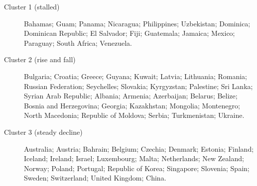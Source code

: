 \begin{description}
\item[Cluster 1 (stalled)] Bahamas; Guam; Panama; Nicaragua; Philippines; Uzbekistan; Dominica; Dominican Republic; El Salvador; Fiji; Guatemala; Jamaica; Mexico; Paraguay; South Africa; Venezuela.
\item[Cluster 2 (rise and fall)] Bulgaria; Croatia; Greece; Guyana; Kuwait; Latvia; Lithuania; Romania; Russian Federation; Seychelles; Slovakia; Kyrgyzstan; Palestine; Sri Lanka; Syrian Arab Republic; Albania; Armenia; Azerbaijan; Belarus; Belize; Bosnia and Herzegovina; Georgia; Kazakhstan; Mongolia; Montenegro; North Macedonia; Republic of Moldova; Serbia; Turkmenistan; Ukraine.
\item[Cluster 3 (steady decline)] Australia; Austria; Bahrain; Belgium; Czechia; Denmark; Estonia; Finland; Iceland; Ireland; Israel; Luxembourg; Malta; Netherlands; New Zealand; Norway; Poland; Portugal; Republic of Korea; Singapore; Slovenia; Spain; Sweden; Switzerland; United Kingdom; China.
\end{description}
